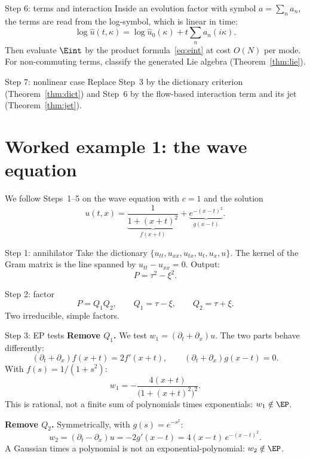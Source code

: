 \begin{aside}{Step 6: terms and interaction}
Inside an evolution factor with symbol $a=\sum_na_n$, the terms are read from the log-symbol, which is linear in time:
\[
\log\hat u(t,\kappa)=\log\hat u_0(\kappa)+t\sum_na_n(i\kappa).
\]
Then evaluate $\Eint$ by the product formula~\eqref{eq:eint} at cost $O(N)$ per mode. For non-commuting terms, classify the generated Lie algebra (Theorem~\ref{thm:lie}).
\end{aside}

\begin{aside}{Step 7: nonlinear case}
Replace Step~3 by the dictionary criterion (Theorem~\ref{thm:dict}) and Step~6 by the flow-based interaction term and its jet (Theorem~\ref{thm:jet}).
\end{aside}

\section{Worked example 1: the wave equation}

We follow Steps~1--5 on the wave equation with $c=1$ and the solution
\[
u(t,x)=\underbrace{\frac{1}{1+(x+t)^2}}_{f(x+t)}+\underbrace{e^{-(x-t)^2}}_{g(x-t)} .
\]

\begin{example}{Step 1: annihilator}
Take the dictionary $\{u_{tt},u_{xx},u_{tx},u_t,u_x,u\}$. The kernel of the Gram matrix is the line spanned by $u_{tt}-u_{xx}=0$. Output:
\[
P=\tau^2-\xi^2 .
\]
\end{example}

\begin{example}{Step 2: factor}
\[
P=Q_1Q_2,\qquad Q_1=\tau-\xi,\qquad Q_2=\tau+\xi .
\]
Two irreducible, simple factors.
\end{example}

\begin{example}{Step 3: EP tests}
\textbf{Remove $Q_1$.} We test $w_1=(\partial_t+\partial_x)u$. The two parts behave differently:
\[
(\partial_t+\partial_x)f(x+t)=2f'(x+t),\qquad (\partial_t+\partial_x)g(x-t)=0 .
\]
With $f(s)=1/(1+s^2)$:
\[
w_1=-\frac{4(x+t)}{\big(1+(x+t)^2\big)^2}.
\]
This is rational, not a finite sum of polynomials times exponentials: $w_1\notin\EP$.

\textbf{Remove $Q_2$.} Symmetrically, with $g(s)=e^{-s^2}$:
\[
w_2=(\partial_t-\partial_x)u=-2g'(x-t)=4(x-t)\,e^{-(x-t)^2}.
\]
A Gaussian times a polynomial is not an exponential-polynomial: $w_2\notin\EP$.
\end{example}

